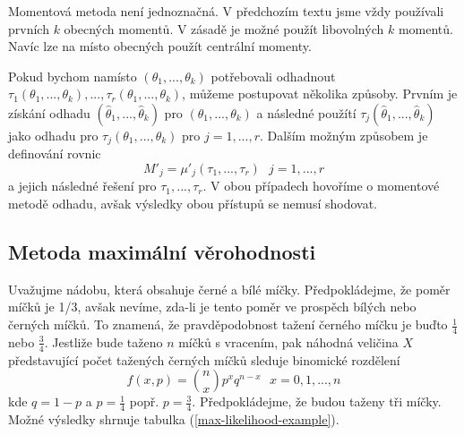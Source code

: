 Momentová metoda není jednoznačná. V předchozím textu jsme vždy používali prvních $k$ obecných momentů. V zásadě je možné použít libovolných $k$ momentů. Navíc lze na místo obecných použít centrální momenty.

Pokud bychom namísto $(\theta_1, ..., \theta_k)$ potřebovali odhadnout $\tau_1(\theta_1, ..., \theta_k), ..., \tau_r(\theta_1, ..., \theta_k)$, můžeme postupovat několika způsoby. Prvním je získání odhadu $(\hat{\theta}_1, ..., \hat{\theta}_k)$ pro  $(\theta_1, ..., \theta_k)$ a následné použítí $\tau_j(\hat{\theta}_1, ..., \hat{\theta}_k)$ jako odhadu pro $\tau_j(\theta_1, ..., \theta_k)$ pro $j = 1, ..., r$. Dalším možným způsobem je definování rovnic
\begin{equation*}
M'_j = \mu'_j(\tau_1, ..., \tau_r) ~~~ j = 1, ..., r
\end{equation*}
a jejich následné řešení pro $\tau_1, ..., \tau_r$. V obou případech hovoříme o momentové metodě odhadu, avšak výsledky obou přístupů se nemusí shodovat.

\subsection{Metoda maximální věrohodnosti}

Uvažujme nádobu, která obsahuje černé a bílé míčky. Předpokládejme, že poměr míčků je 1/3, avšak nevíme, zda-li je tento poměr ve prospěch bílých nebo černých míčků. To znamená, že pravděpodobnost tažení černého míčku je buďto $\frac{1}{4}$ nebo $\frac{3}{4}$. Jestliže bude taženo $n$ míčků s vracením, pak náhodná veličina $X$ představující počet tažených černých míčků sleduje binomické rozdělení
\begin{equation*}
f(x, p) = \binom{n}{x} p^x q^{n - x} ~~~ x = 0, 1, ..., n
\end{equation*}
kde $q = 1 - p$ a $p = \frac{1}{4}$ popř. $p = \frac{3}{4}$. Předpokládejme, že budou taženy tři míčky. Možné výsledky shrnuje tabulka (\ref{max-likelihood-example}).

